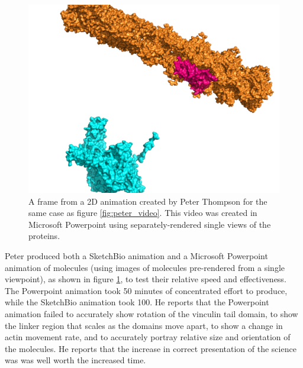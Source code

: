 \documentclass[twocolumn]{bmcart}%
\begin{document}
\begin{figure}[h!]
\centering
\includegraphics[width=0.9\columnwidth]{peter_powerpoint_animation.png}
\caption{A frame from a 2D animation created by Peter Thompson for the same case as figure \ref{fig:peter_video}.
This video was created in Microsoft Powerpoint using separately-rendered single views of the proteins.}
\label{fig:peter_powerpoint}
\end{figure}

Peter produced both a SketchBio animation and a Microsoft Powerpoint animation of molecules (using images of molecules pre-rendered from a single viewpoint), as shown in figure \ref{fig:peter_powerpoint}, to test their relative speed and effectiveness.
The Powerpoint animation took 50 minutes of concentrated effort to produce, while the SketchBio animation took 100. He reports that the Powerpoint animation failed to accurately show rotation of the vinculin tail domain, to show the linker region that scales as the domains move apart, to show a change in actin movement rate, and to accurately portray relative size and orientation of the molecules.  He reports that the increase in correct presentation of the science was was well worth the increased time.
\end{document}
